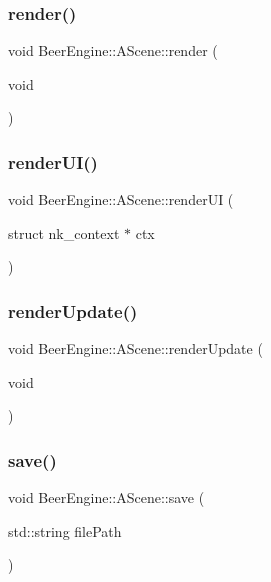 \subsubsection{\texorpdfstring{render()}{render()}}
{\footnotesize\ttfamily void Beer\+Engine\+::\+A\+Scene\+::render (\begin{DoxyParamCaption}\item[{void}]{ }\end{DoxyParamCaption})}

\mbox{\label{class_beer_engine_1_1_a_scene_a93d3ef94fbd5201f10e9185833bc3e0c}} 
\subsubsection{\texorpdfstring{render\+U\+I()}{renderUI()}}
{\footnotesize\ttfamily void Beer\+Engine\+::\+A\+Scene\+::render\+UI (\begin{DoxyParamCaption}\item[{struct nk\+\_\+context $\ast$}]{ctx }\end{DoxyParamCaption})}

\mbox{\label{class_beer_engine_1_1_a_scene_accb108fe6723d99c36a85eb51a25820e}} 
\subsubsection{\texorpdfstring{render\+Update()}{renderUpdate()}}
{\footnotesize\ttfamily void Beer\+Engine\+::\+A\+Scene\+::render\+Update (\begin{DoxyParamCaption}\item[{void}]{ }\end{DoxyParamCaption})}

\mbox{\label{class_beer_engine_1_1_a_scene_a65e03ade02de4673cd25544d4843c6d8}} 
\subsubsection{\texorpdfstring{save()}{save()}}
{\footnotesize\ttfamily void Beer\+Engine\+::\+A\+Scene\+::save (\begin{DoxyParamCaption}\item[{std\+::string}]{file\+Path }\end{DoxyParamCaption})}

